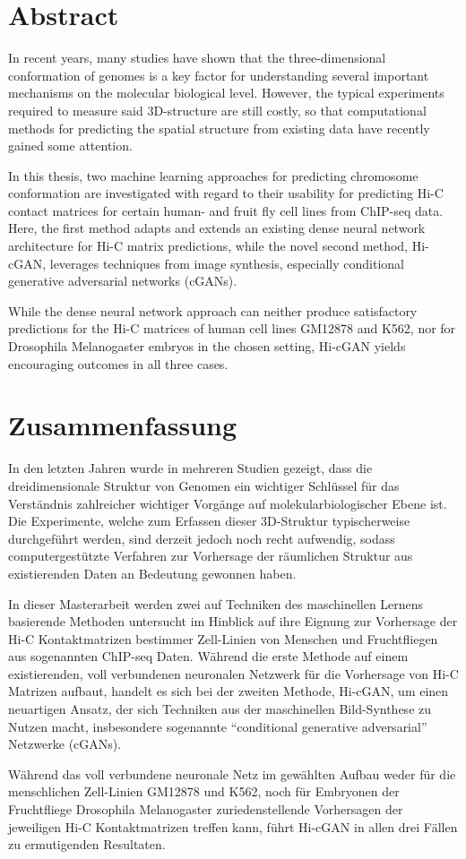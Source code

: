 \section*{Abstract}

In recent years, many studies have shown that the three-dimensional conformation of genomes is a key factor
for understanding several important mechanisms on the molecular biological level.
However, the typical experiments required to measure said 3D-structure are still costly,
so that computational methods for predicting the spatial structure from existing data have recently gained some attention. 

In this thesis, two machine learning approaches for predicting chromosome conformation are investigated with 
regard to their usability for predicting Hi-C contact matrices for certain human- and fruit fly cell lines
from ChIP-seq data.
Here, the first method adapts and extends an existing dense neural network architecture for Hi-C matrix predictions, 
while the novel second method, Hi-cGAN, leverages techniques from image synthesis, especially conditional generative adversarial networks (cGANs).

While the dense neural network approach can neither produce satisfactory predictions for the Hi-C matrices of human cell lines GM12878 and K562,
nor for Drosophila Melanogaster embryos in the chosen setting, Hi-cGAN yields encouraging outcomes in all three cases.


\section*{Zusammenfassung}

In den letzten Jahren wurde in mehreren Studien gezeigt, dass die dreidimensionale Struktur von Genomen ein
wichtiger Schlüssel für das Verständnis zahlreicher wichtiger Vorgänge auf molekularbiologischer Ebene ist.
Die Experimente, welche zum Erfassen dieser 3D-Struktur typischerweise durchgeführt werden,
sind derzeit jedoch noch recht aufwendig, sodass computergestützte Verfahren zur Vorhersage 
der räumlichen Struktur aus existierenden Daten an Bedeutung gewonnen haben.

In dieser Masterarbeit werden zwei auf Techniken des maschinellen Lernens basierende Methoden untersucht
im Hinblick auf ihre Eignung zur Vorhersage der Hi-C Kontaktmatrizen bestimmer Zell-Linien von Menschen und Fruchtfliegen aus sogenannten ChIP-seq Daten.
Während die erste Methode auf einem existierenden, voll verbundenen neuronalen Netzwerk für die Vorhersage von Hi-C Matrizen aufbaut,
handelt es sich bei der zweiten Methode, Hi-cGAN, um einen neuartigen Ansatz, der sich Techniken aus der maschinellen Bild-Synthese zu Nutzen macht,
insbesondere sogenannte ``conditional generative adversarial'' Netzwerke (cGANs).

Während das voll verbundene neuronale Netz im gewählten Aufbau weder für die menschlichen Zell-Linien GM12878 und K562, 
noch für Embryonen der Fruchtfliege Drosophila Melanogaster zuriedenstellende Vorhersagen der jeweiligen Hi-C Kontaktmatrizen treffen kann, 
führt Hi-cGAN in allen drei Fällen zu ermutigenden Resultaten.
